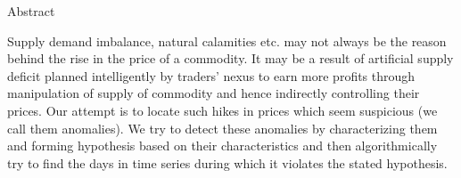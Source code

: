 \begin{center}
\LARGE{Abstract}
\end{center}

\vspace{0.5in}


Supply demand imbalance, natural calamities etc. may not always be the reason behind the rise in the price of a commodity. It may be a result of artificial supply deficit planned intelligently by traders’ nexus to earn more profits through manipulation of supply of commodity and hence indirectly controlling their prices. Our attempt is to locate such hikes in prices which seem suspicious (we call them anomalies). We try to detect these anomalies by characterizing them and forming hypothesis based on their characteristics and then algorithmically try to find the
days in time series during which it violates the stated hypothesis.
